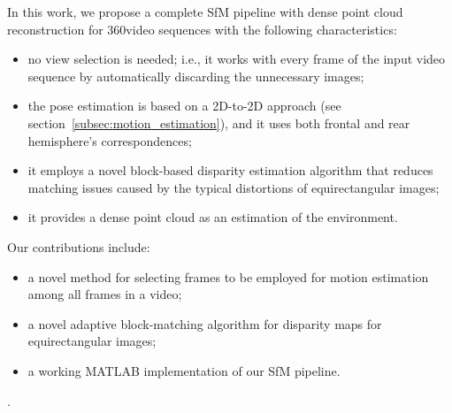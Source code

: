 In this work, we propose a complete SfM pipeline with dense point cloud 
reconstruction for 360\degree video sequences with the following 
characteristics:
\begin{itemize}
	\item no view selection is needed; i.e., it works with every frame of the 
	input video sequence by automatically discarding the unnecessary images;
	\item the pose estimation is based on a 2D-to-2D approach
	(see section~\ref{subsec:motion_estimation}), and it uses both frontal and
	rear hemisphere's correspondences;
	\item it employs a novel block-based disparity estimation algorithm that 
	reduces matching issues caused by the typical distortions of equirectangular images;
	\item it provides a dense point cloud as an estimation of the environment.
\end{itemize}
%
Our contributions include:
%
\begin{itemize}
	\item a novel method for selecting frames to be employed for motion estimation 
    among all frames in a video;
	\item a novel adaptive block-matching algorithm for disparity maps for 
	equirectangular images;
	\item a working MATLAB implementation of our SfM pipeline.
\end{itemize}.
